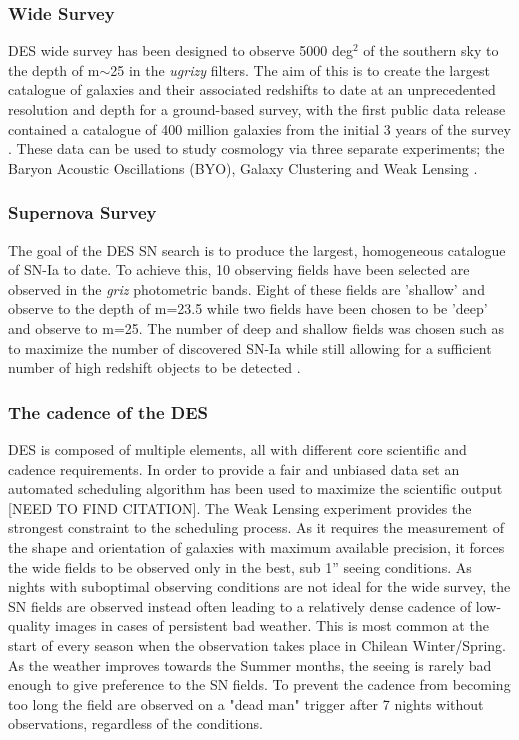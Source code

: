 \subsubsection{Wide Survey}
DES wide survey has been designed to observe 5000 deg$^2$ of the southern sky to the depth of m$\sim$25 in the \textit{ugrizy} filters. The aim of this is to create the largest catalogue of galaxies and their associated redshifts to date at an unprecedented resolution and depth for a ground-based survey, with the first public data release contained a catalogue of 400 million galaxies from the initial 3 years of the survey \citep{DES2018}. These data can be used to study cosmology via three separate experiments; the Baryon Acoustic Oscillations (BYO), Galaxy Clustering and Weak Lensing \citep{DES2016,Prat2017,Drlica-Wagner2017,DES2017}.

\subsubsection{Supernova Survey}
The goal of the DES SN search is to produce the largest, homogeneous catalogue of SN-Ia to date. To achieve this, 10 observing fields have been selected are observed in the \textit{griz} photometric bands. Eight of these fields are 'shallow' and observe to the depth of m=23.5 while two fields have been chosen to be 'deep' and observe to m=25. The number of deep and shallow fields was chosen such as to maximize the number of discovered SN-Ia while still allowing for a sufficient number of high redshift objects to be detected \citep{Bernstein2012}.

\subsubsection{The cadence of the DES}
DES is composed of multiple elements, all with different core scientific and cadence requirements. In order to provide a fair and unbiased data set an automated scheduling algorithm has been used to maximize the scientific output [NEED TO FIND CITATION]. The Weak Lensing experiment provides the strongest constraint to the scheduling process. As it requires the measurement of the shape and orientation of galaxies with maximum available precision, it forces the wide fields to be observed only in the best, sub 1'' seeing conditions. As nights with suboptimal observing conditions are not ideal for the wide survey, the SN fields are observed instead often leading to a relatively dense cadence of low-quality images in cases of persistent bad weather. This is most common at the start of every season when the observation takes place in Chilean Winter/Spring. As the weather improves towards the Summer months, the seeing is rarely bad enough to give preference to the SN fields. To prevent the cadence from becoming too long the field are observed on a "dead man" trigger after 7 nights without observations, regardless of the conditions.

